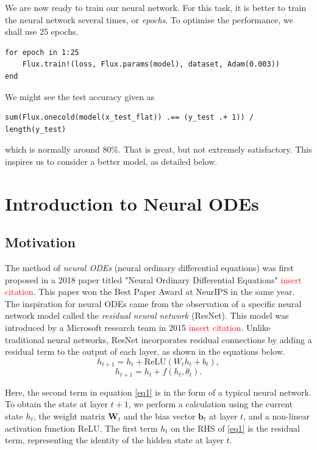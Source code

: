 \documentclass[a4paper,11pt,titlepage]{article}
\theoremstyle{definition}
\theoremstyle{plain}
\theoremstyle{remark}
\begin{document}
We are now ready to train our neural network. For this task, it is better to train the neural network several times, or \textit{epochs}. To optimise the performance, we shall use 25 epochs.

\begin{verbatim}
for epoch in 1:25
    Flux.train!(loss, Flux.params(model), dataset, Adam(0.003))
end
\end{verbatim}

We might see the test accuracy given as

\begin{verbatim}
sum(Flux.onecold(model(x_test_flat)) .== (y_test .+ 1)) / length(y_test)
\end{verbatim}

which is normally around $80\%$. That is great, but not extremely satisfactory. This inspires us to consider a better model, as detailed below.

\pagebreak
\section{Introduction to Neural ODEs}

\subsection{Motivation}

The method of \textit{neural ODEs} (neural ordinary differential equations) was first proposed in a 2018 paper titled "Neural Ordinary Differential Equations" \textcolor{red}{insert citation}. This paper won the Best Paper Award at NeurIPS in the same year. The inspiration for neural ODEs came from the observation of a specific neural network model called the \textit{residual neural network} (ResNet). This model was introduced by a Microsoft research team in 2015 \textcolor{red}{insert citation}. Unlike traditional neural networks, ResNet incorporates residual connections by adding a residual term to the output of each layer, as shown in the equations below.
\begin{equation}\label{eq1}
    h_{t+1} = h_t + \mathrm{ReLU}\left(W_t h_t + b_t\right),\tag{1}
\end{equation}
\begin{equation}\label{eq2}
    h_{t+1} = h_t + f\left(h_t, \theta_t\right).\tag{2}
\end{equation}

Here, the second term in equation \ref{eq1} is in the form of a typical neural network. To obtain the state at layer $t+1$, we perform a calculation using the current state $h_t$, the weight matrix $\textbf{W}_t$ and the bias vector $\textbf{b}_t$ at layer $t$, and a non-linear activation function ReLU. The first term $h_t$ on the RHS of \ref{eq1} is the residual term, representing the identity of the hidden state at layer $t$.
\end{document}
